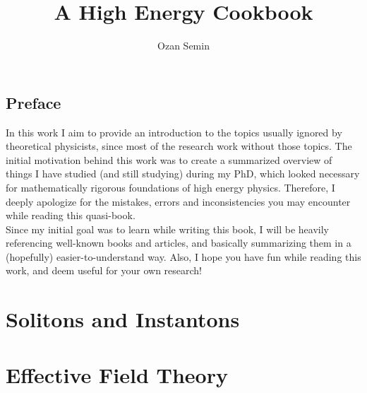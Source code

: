 \documentclass[14pt,openany,a4paper]{memoir}
\author{Ozan Semin}
\title{A High Energy Cookbook}
\begin{document}
\maketitle
\frontmatter

\tableofcontents

\chapter{Preface}
In this work I aim to provide an introduction to the topics usually ignored by theoretical physicists, since most of the research work without those topics. The initial motivation behind this work was to create a summarized overview of things I have studied (and still studying) during my PhD, which looked necessary for mathematically rigorous foundations of high energy physics. Therefore, I deeply apologize for the mistakes, errors and inconsistencies you may encounter while reading this quasi-book. 
\\
Since my initial goal was to learn while writing this book, I will be heavily referencing well-known books and articles, and basically summarizing them in a (hopefully) easier-to-understand way. Also, I hope you have fun while reading this work, and deem useful for your own research! 

\mainmatter

\part{Solitons and Instantons}





\part{Effective Field Theory}


\end{document}
